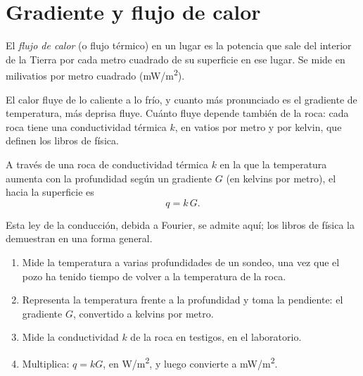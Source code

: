 \section{Gradiente y flujo de calor}

\begin{definition}\label{def:g12:internal-heat:heat-flow}
El \emph{flujo de calor} (o flujo térmico) en un lugar es
la potencia que sale del interior de la Tierra por cada metro cuadrado de su
superficie en ese lugar. Se mide en milivatios por metro cuadrado
(\unit{mW/m^2}).
\end{definition}

El calor fluye de lo caliente a lo frío, y cuanto más pronunciado es el
gradiente de temperatura, más deprisa fluye. Cuánto fluye depende también de
la roca: cada roca tiene una conductividad térmica $k$, en vatios por metro y
por kelvin, que definen los libros de física.

\begin{proposition}\label{prop:g12:internal-heat:fourier}
A través de una roca de conductividad térmica $k$ en la que la temperatura
aumenta con la profundidad según un gradiente $G$ (en kelvins por metro), el
 hacia la superficie es
\[
  q = k\,G .
\]
\end{proposition}

Esta ley de la conducción, debida a Fourier, se admite aquí; los libros de
física la demuestran en una forma general.

\begin{method}\label{met:g12:internal-heat:borehole}
\begin{enumerate}
  \item Mide la temperatura a varias profundidades de un sondeo, una vez que
        el pozo ha tenido tiempo de volver a la temperatura de la roca.
  \item Representa la temperatura frente a la profundidad y toma la
        pendiente: el gradiente $G$, convertido a kelvins por metro.
  \item Mide la conductividad $k$ de la roca en testigos, en el
        laboratorio.
  \item Multiplica: $q = kG$, en \unit{W/m^2}, y luego convierte a \unit{mW/m^2}.
\end{enumerate}
\end{method}

